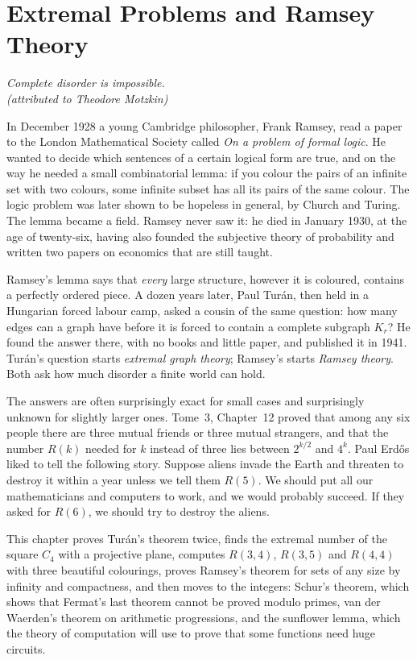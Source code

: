 \chapter{Extremal Problems and Ramsey Theory}

\begin{center}\itshape
Complete disorder is impossible.\\
\upshape(attributed to Theodore Motzkin)
\end{center}

In December 1928 a young Cambridge philosopher, Frank Ramsey, read a paper to the London Mathematical Society called
\emph{On a problem of formal logic}. He wanted to decide which sentences of a certain logical form are true, and on the way
he needed a small combinatorial lemma: if you colour the pairs of an infinite set with two colours, some infinite subset has
all its pairs of the same colour. The logic problem was later shown to be hopeless in general, by Church and Turing. The lemma
became a field. Ramsey never saw it: he died in January 1930, at the age of twenty-six, having also founded the subjective theory of
probability and written two papers on economics that are still taught.

Ramsey's lemma says that \emph{every} large structure, however it is coloured, contains a perfectly ordered piece. A dozen years later,
Paul Tur\'an, then held in a Hungarian forced labour camp, asked a cousin of the same question: how many edges can a graph
have before it is forced to contain a complete subgraph $K_r$? He found the answer there, with no books and little paper, and published it in 1941. Tur\'an's question starts \emph{extremal graph theory}; Ramsey's starts \emph{Ramsey
theory}. Both ask how much disorder a finite world can hold.

The answers are often surprisingly exact for small cases and surprisingly unknown for slightly larger ones. Tome~3, Chapter~12
proved that among any six people there are three mutual friends or three mutual strangers, and that the number $R(k)$ needed for $k$
instead of three lies between $2^{k/2}$ and $4^k$. Paul Erd\H os liked to tell the following story. Suppose aliens invade the Earth and
threaten to destroy it within a year unless we tell them $R(5)$. We should put all our mathematicians and computers to work, and we would
probably succeed. If they asked for $R(6)$, we should try to destroy the aliens.

This chapter proves Tur\'an's theorem twice, finds the extremal number of the square $C_4$ with a projective plane, computes
$R(3,4)$, $R(3,5)$ and $R(4,4)$ with three beautiful colourings, proves Ramsey's theorem for sets of any size by infinity and
compactness, and then moves to the integers: Schur's theorem, which shows that Fermat's last theorem cannot be proved modulo
primes, van der Waerden's theorem on arithmetic progressions, and the sunflower lemma, which the theory of computation will use to
prove that some functions need huge circuits.

